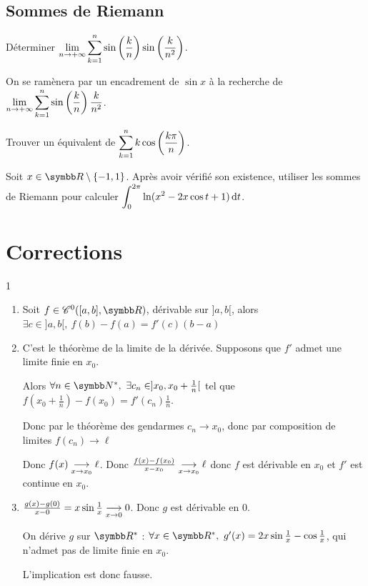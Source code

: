 \subsection{Sommes de Riemann}

\begin{exercice}
    Déterminer $\displaystyle\lim_{n\rightarrow+\infty}\sum_{k=1}^{n}\sin\left(\frac{k}{n}\right)\sin\left(\frac{k}{n^{2}}\right)$.

    On se ramènera par un encadrement de $\sin x$ à la recherche de $\displaystyle \lim_{n\rightarrow+\infty}\sum_{k=1}^{n}\sin\left(\frac{k}{n}\right)\frac{k}{n^{2}}$.
\end{exercice}

\begin{exercice}
    Trouver un équivalent de $\displaystyle \sum_{k=1}^{n}k \cos\left(\frac{k\pi}{n}\right)$.
\end{exercice}

\begin{exercice}
    Soit $x \in \R \setminus \{-1,1\}$.
    Après avoir vérifié son existence, utiliser les sommes de Riemann pour calculer $\displaystyle \int_{0}^{2\pi}\ln(x^{2}-2x \cos t + 1)\,\mathrm{d}t$.
\end{exercice}

\newpage
\section{Corrections}

\begin{correction}{1}
\begin{enumerate}
    \item Soit $f \in \mathscr C^0([a,b],\R)$, dérivable sur $]a,b[$, alors $\exists c \in ]a,b[,~f(b) - f(a) = f'(c)(b - a)$
    
    \item C'est le théorème de la limite de la dérivée. Supposons que $f'$ admet une limite finie en $x_0$.
    
    Alors $\forall n \in \N^*,~\exists c_n \in ]x_0,x_0 + \frac 1 n[$ tel que $f(x_0 + \frac 1 n) - f(x_0) = f'(c_n) \frac 1 n$.

    Donc par le théorème des gendarmes $c_n \to x_0$, donc par composition de limites $f(c_n) \to \ell$

    Donc $f(x) \underset{x \to x_0}{\longrightarrow} \ell$. Donc $\frac{f(x) - f(x_0)}{x - x_0} \underset{x \to x_0}{\longrightarrow} \ell$ donc $f$ est dérivable en $x_0$ et $f'$ est continue en $x_0$.
    
    \item $\frac {g(x) - g(0)}{x - 0} = x\sin \frac 1 x \underset{x \to 0}{\longrightarrow} 0$. Donc $g$ est dérivable en $0$.

    On dérive $g$ sur $\R^*$ : $\forall x \in \R^*,~g'(x) = 2x\sin \frac 1 x - \cos \frac 1 x$, qui n'admet pas de limite finie en $x_0$.

    L'implication est donc fausse.
\end{enumerate}    
\end{correction}

